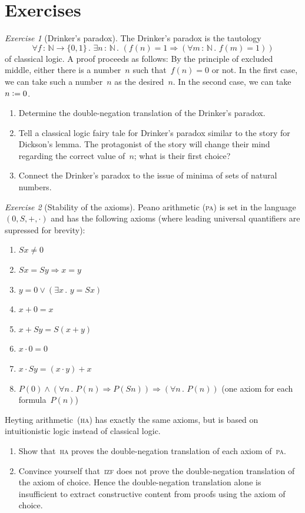 \documentclass[10pt,reqno,a4paper,openany]{amsbook}
\theoremstyle{definition}
\theoremstyle{plain}
\theoremstyle{remark}
\newcommand{\NN}{\mathbb{N}}
\newcommand{\?}{\,{:}\,}
\renewcommand{\_}{\mathpunct{.}\,}
\newcommand{\defeq}{\vcentcolon=}
\newtheorem{exercise}{Exercise}[chapter]
\renewcommand{\theenumi}{\alph{enumi}}
\begin{document}
\section{Exercises}

\begin{exercise}[Drinker's paradox]
The Drinker's paradox is the tautology
\[ \forall f \? \NN \to \{0,1\}\_ \exists n \? \NN\_ (f(n) = 1
\Rightarrow (\forall m \? \NN\_ f(m) = 1)) \]
of classical logic. A proof proceeds as follows: By the principle of
excluded middle, either there is a number~$n$ such that~$f(n) = 0$ or not. In
the first case, we can take such a number~$n$ as the desired~$n$. In the second
case, we can take~$n \defeq 0$.
\begin{enumerate}
\item Determine the double-negation translation of the Drinker's paradox.
\item Tell a classical logic fairy tale for Drinker's paradox similar to the
story for Dickson's lemma. The protagonist of the story will change their mind
regarding the correct value of~$n$; what is their first choice?
\item Connect the Drinker's paradox to the issue of minima of sets of natural
numbers.
\end{enumerate}
\end{exercise}

\begin{exercise}[Stability of the axioms]\label{ex:stability-axioms}
Peano arithmetic (\textsc{pa}) is set in the language~$(0,S,+,\cdot)$ and has
the following axioms (where leading universal quantifiers are supressed for
brevity):
\begin{enumerate}
\renewcommand{\theenumi}{\arabic{enumi}}
\item $Sx \neq 0$
\item $Sx = Sy \Rightarrow x = y$
\item $y = 0 \vee (\exists x\_ y = Sx)$
\item $x + 0 = x$
\item $x + Sy = S(x+y)$
\item $x \cdot 0 = 0$
\item $x \cdot Sy = (x \cdot y) + x$
\item $P(0) \wedge (\forall n\_ P(n) \Rightarrow P(Sn)) \Longrightarrow
(\forall n\_ P(n))$ (one axiom for each formula~$P(n)$)
\end{enumerate}
Heyting arithmetic~(\textsc{ha}) has exactly the same axioms, but is based on intuitionistic
logic instead of classical logic.
\begin{enumerate}
\item Show that~\textsc{ha} proves the double-negation translation of each
axiom of~\textsc{pa}.
\item Convince yourself that~\textsc{izf} does not prove the double-negation
translation of the axiom of choice. Hence the double-negation translation
alone is insufficient to extract constructive content from proofs using the
axiom of choice.
\end{enumerate}
\end{exercise}
\end{document}
